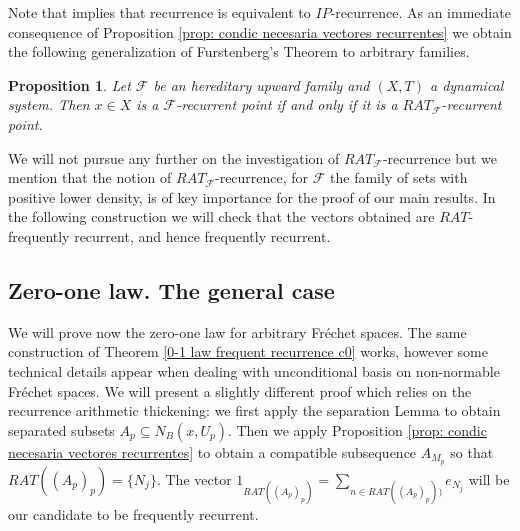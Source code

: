 \documentclass[11pt]{amsart}
\newtheorem{proposition}[theorem]{Proposition}
\begin{document}
Note that \cite[Theorem 2.17]{Fur81} implies that recurrence is equivalent to $IP$-recurrence.
As an immediate consequence of Proposition \ref{prop: condic necesaria vectores recurrentes} we obtain the following generalization of Furstenberg's Theorem to arbitrary families.
\begin{proposition}\label{prop: RAT_F}
Let $\mathcal F$ be an hereditary upward family and $(X,T)$ a dynamical system. Then $x\in X$ is a $\mathcal F$-recurrent point if and only if it is a $RAT_\mathcal F$-recurrent point.
\end{proposition}

We will not pursue any further on the investigation of $RAT_\mathcal F$-recurrence but we mention that  the notion of $RAT_\mathcal F$-recurrence, for $\mathcal F$ the family of sets with positive lower density, is of key importance for the proof of our main results. In the following construction we will check that
the vectors obtained are $RAT$-frequently recurrent, and hence frequently recurrent.


\subsection {Zero-one law. The general case}\label{section 0-1 general case}
We will prove now the zero-one law for arbitrary Fr\'echet spaces. The same construction of Theorem \ref{0-1 law frequent recurrence c0} works, however some technical details appear when dealing with unconditional basis on non-normable Fr\'echet spaces.
We will present a slightly different proof which relies on the recurrence arithmetic thickening: we first apply the separation Lemma to obtain separated subsets $A_p\subseteq N_B(x,U_p)$. Then we apply Proposition \ref{prop: condic necesaria vectores recurrentes} to obtain a compatible subsequence $A_{M_p}$ so that  $RAT((A_p)_p)=\{N_j\}$. The vector $1_{RAT((A_p)_p)}=\sum_{n\in {RAT((A_p)_p))}} e_{N_j}$ will be our candidate to be frequently recurrent. 

\end{document}
